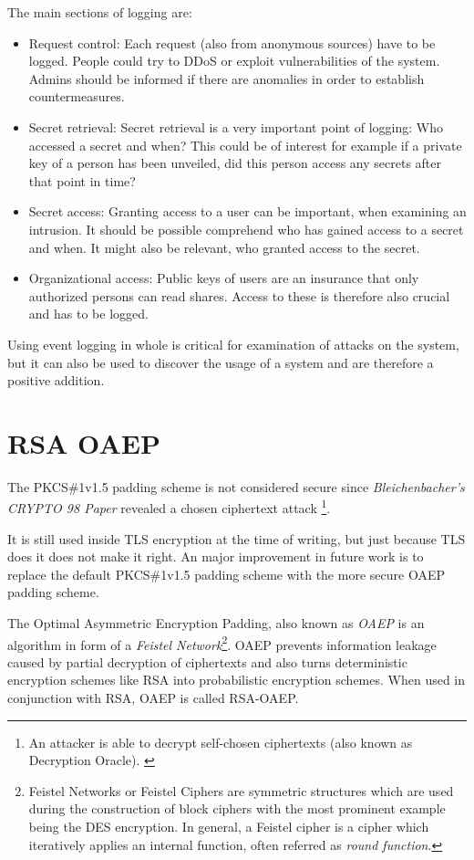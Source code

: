 The main sections of logging are:
\begin{itemize}
  \item Request control: Each request (also from anonymous sources) have
  to be logged. People could try to DDoS or exploit vulnerabilities of the
  system. Admins should be informed if there are anomalies in order
  to establish countermeasures.

  \item Secret retrieval: Secret retrieval is a very important point of logging:
  Who accessed a secret and when? This could be of interest for example if
  a private key of a person has been unveiled, did this person access any
  secrets after that point in time?

  \item Secret access: Granting access to a user can be important, when
  examining an intrusion. It should be possible comprehend who has gained
  access to a secret and when. It might also be relevant, who granted access
  to the secret.

  \item Organizational access: Public keys of users are an insurance that
  only authorized persons can read shares. Access to these is therefore
  also crucial and has to be logged.
\end{itemize}

Using event logging in whole is critical for examination of attacks on the
system, but it can also be used to discover the usage of a system and are
therefore a positive addition.

\section{RSA OAEP}

The PKCS\#1v1.5 padding scheme is not considered secure since
\textit{Bleichenbacher's CRYPTO 98 Paper} \cite{rsabulletin}
revealed a chosen ciphertext attack \footnote{
  An attacker is able to decrypt self-chosen ciphertexts (also
  known as Decryption Oracle). \cite[p. 70]{baumann2014kryptographische}
}.

It is still used inside TLS encryption at the time of writing, but just because
TLS does it does not make it right. An major improvement in future work is to
replace the default PKCS\#1v1.5 padding scheme with the more secure OAEP
padding scheme.

The Optimal Asymmetric Encryption Padding, also known as \textit{OAEP}
is an algorithm in form of a \textit{Feistel Network}\footnote{
  Feistel Networks or Feistel Ciphers are symmetric structures which are used
  during the construction of block ciphers with the most prominent example
  being the DES encryption. In general, a Feistel cipher is a cipher which
  iteratively applies an internal function, often referred as \textit{round function}.
}. OAEP prevents information leakage caused by partial decryption of 
ciphertexts and also turns deterministic encryption schemes like RSA into
probabilistic encryption schemes. When used in conjunction with RSA, OAEP is
called RSA-OAEP.

